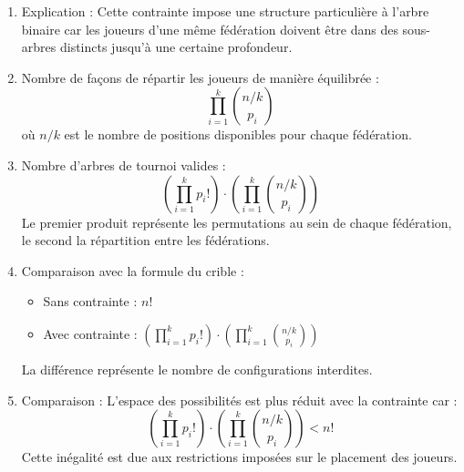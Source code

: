 \documentclass[10pt,a4paper]{article}
\begin{document}
\begin{enumerate}

        \item Explication : Cette contrainte impose une structure particulière à l'arbre binaire car
        les joueurs d'une même fédération doivent être dans des sous-arbres distincts jusqu'à une
        certaine profondeur.

        \item Nombre de façons de répartir les joueurs de manière équilibrée :
        $$\prod_{i=1}^k \binom{n/k}{p_i}$$
        où $n/k$ est le nombre de positions disponibles pour chaque fédération.

        \item Nombre d'arbres de tournoi valides :
        $$\left(\prod_{i=1}^k p_i!\right) \cdot \left(\prod_{i=1}^k \binom{n/k}{p_i}\right)$$ Le
        premier produit représente les permutations au sein de chaque fédération, le second la
        répartition entre les fédérations.

        \item Comparaison avec la formule du crible :
          \begin{itemize}
               \item Sans contrainte : $n!$
               \item Avec contrainte :
               $\left(\prod_{i=1}^k p_i!\right) \cdot \left(\prod_{i=1}^k \binom{n/k}{p_i}\right)$
          \end{itemize}
        La différence représente le nombre de configurations interdites.

        \item Comparaison : L'espace des possibilités est plus réduit avec la contrainte car :
        $$\left(\prod_{i=1}^k p_i!\right) \cdot \left(\prod_{i=1}^k \binom{n/k}{p_i}\right) < n!$$
        Cette inégalité est due aux restrictions imposées sur le placement des joueurs.

\end{enumerate}
\end{document}

